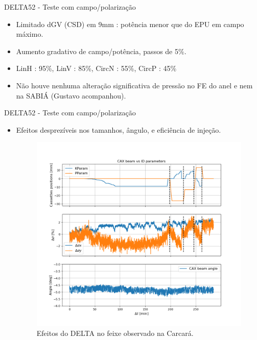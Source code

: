 \documentclass{beamer}					  %
\begin{document}
\begin{frame}{DELTA52 - Teste com campo/polarização}
    \begin{itemize}
            \item Limitado dGV (CSD) em 9mm : potência menor que do EPU em campo máximo.
            \item Aumento gradativo de campo/potência, passos de 5\%.
            \item LinH : 95\%, LinV : 85\%, CircN : 55\%, CircP : 45\%
            \item Não houve nenhuma alteração significativa de pressão no FE do anel e nem na SABIÁ (Gustavo acompanhou).
    \end{itemize}
\end{frame}

\begin{frame}{DELTA52 - Teste com campo/polarização}
    \begin{itemize}
            \item Efeitos desprezíveis nos tamanhos, ângulo, e eficiência de injeção.
            \begin{figure}[H]
    		\centering
            \includegraphics[width=.7\textwidth]{2023-12-12/figures/CAX_beam_id_param.png}
            \caption{Efeitos do DELTA no feixe observado na Carcará.}
            \label{fig:cax_param}
    \end{figure}
    \end{itemize}
\end{frame}
\end{document}
